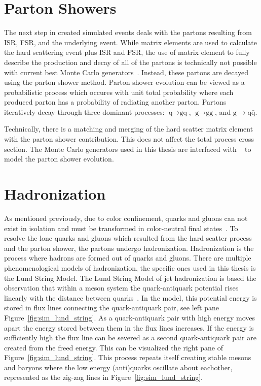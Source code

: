 \section{Parton Showers}
The next step in created simulated events deals with the partons resulting from ISR,
FSR, and the underlying event. 
While matrix elements are used to calculate the hard scattering event plus ISR and FSR, 
the use of matrix element to fully describe the production and decay of all of the
partons is technically not possible with current best Monte Carlo generators~\cite{PhysRevD.94.074005}. 
Instead, these partons are decayed using the parton shower method. 
Parton shower evolution can be viewed as a probabilistic process 
which occures with unit total probability where each produced parton has a probability
of radiating another parton. Partons iteratively decay through three 
dominant processes: $\textrm{q} \to \textrm{gq}$, $\textrm{g} \to \textrm{gg}$, 
and $\textrm{g} \to \textrm{q}\bar{\textrm{q}}$. 

Technically, there is a matching and merging of the hard scatter matrix element with the
parton shower contribution. This does not affect the total process cross section.
The Monte Carlo generators used in this thesis are interfaced with 
~\cite{Sjostrand:2014zea} to model the parton shower evolution.



\section{Hadronization}
As mentioned previously, due to color confinement, quarks and gluons can not exist in isolation
and must be transformed in color-neutral final states~\cite{Hoche:2014rga}. 
To resolve the lone quarks and gluons which resulted from the hard scatter process and the parton 
shower, the partons undergo hadronization. Hadronization is the process where hadrons are formed 
out of quarks and gluons. There are multiple phenomenological models of hadronization, the
specific ones used in this thesis is the Lund String Model. The Lund String Model of jet
hadronization is based the observation that within a meson system the quark-antiquark 
potential rises linearly with the distance between quarks~\cite{Bali:1992ab}. In the model, this
potential energy is stored in flux lines connecting the quark-antiquark pair, see left pane 
Figure~\ref{fig:sim_lund_string}. As a quark-antiquark 
pair with high energy moves apart the energy stored between them in the flux lines increases. If the energy
is sufficiently high the flux line can be severed as a second quark-antiquark pair are created from
the freed energy. This can be visualized the right pane of Figure~\ref{fig:sim_lund_string}.
This process repeats itself creating stable mesons and baryons where the low energy (anti)quarks
oscillate about eachother, represented as the zig-zag lines in Figure~\ref{fig:sim_lund_string}.

